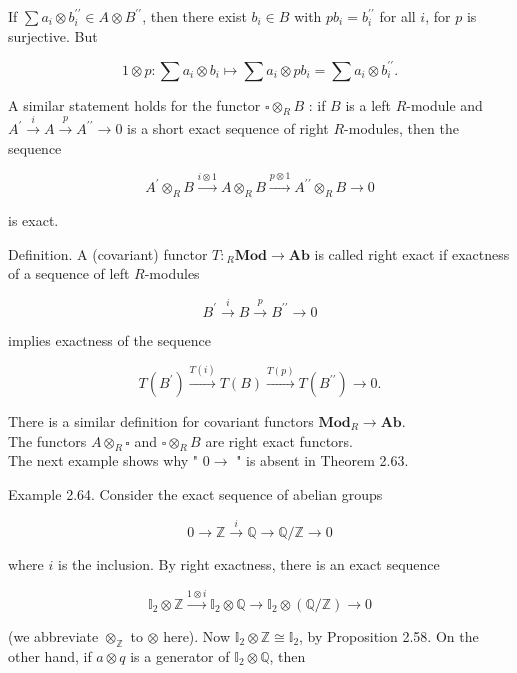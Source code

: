 \documentclass[10pt]{article}
\begin{document}
If $\sum a_{i} \otimes b_{i}^{\prime \prime} \in A \otimes B^{\prime \prime}$, then there exist $b_{i} \in B$ with $p b_{i}=b_{i}^{\prime \prime}$ for all $i$, for $p$ is surjective. But

$$
1 \otimes p: \sum a_{i} \otimes b_{i} \mapsto \sum a_{i} \otimes p b_{i}=\sum a_{i} \otimes b_{i}^{\prime \prime} .
$$

A similar statement holds for the functor $\square \otimes_{R} B$ : if $B$ is a left $R$-module and $A^{\prime} \xrightarrow{i} A \xrightarrow{p} A^{\prime \prime} \rightarrow 0$ is a short exact sequence of right $R$-modules, then the sequence

$$
A^{\prime} \otimes_{R} B \xrightarrow{i \otimes 1} A \otimes_{R} B \xrightarrow{p \otimes 1} A^{\prime \prime} \otimes_{R} B \rightarrow 0
$$

is exact.

Definition. A (covariant) functor $T:{ }_{R} \mathbf{M o d} \rightarrow \mathbf{A b}$ is called right exact if exactness of a sequence of left $R$-modules

$$
B^{\prime} \xrightarrow{i} B \xrightarrow{p} B^{\prime \prime} \rightarrow 0
$$

implies exactness of the sequence

$$
T\left(B^{\prime}\right) \xrightarrow{T(i)} T(B) \xrightarrow{T(p)} T\left(B^{\prime \prime}\right) \rightarrow 0 .
$$

There is a similar definition for covariant functors $\mathbf{M o d}_{R} \rightarrow \mathbf{A b}$.\\
The functors $A \otimes_{R} \square$ and $\square \otimes_{R} B$ are right exact functors.\\
The next example shows why " $0 \rightarrow$ " is absent in Theorem 2.63.

Example 2.64. Consider the exact sequence of abelian groups

$$
0 \rightarrow \mathbb{Z} \xrightarrow{i} \mathbb{Q} \rightarrow \mathbb{Q} / \mathbb{Z} \rightarrow 0
$$

where $i$ is the inclusion. By right exactness, there is an exact sequence

$$
\mathbb{I}_{2} \otimes \mathbb{Z} \xrightarrow{1 \otimes i} \mathbb{I}_{2} \otimes \mathbb{Q} \rightarrow \mathbb{I}_{2} \otimes(\mathbb{Q} / \mathbb{Z}) \rightarrow 0
$$

(we abbreviate $\otimes_{\mathbb{Z}}$ to $\otimes$ here). Now $\mathbb{I}_{2} \otimes \mathbb{Z} \cong \mathbb{I}_{2}$, by Proposition 2.58. On the other hand, if $a \otimes q$ is a generator of $\mathbb{I}_{2} \otimes \mathbb{Q}$, then
\end{document}

